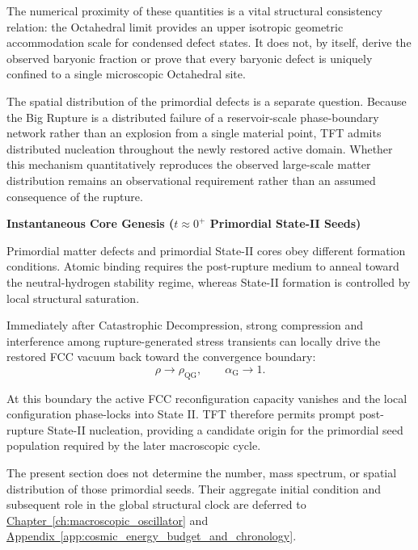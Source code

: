 The numerical proximity of these quantities is a vital structural consistency relation: the Octahedral limit provides an upper isotropic geometric accommodation scale for condensed defect states. It does not, by itself, derive the observed baryonic fraction or prove that every baryonic defect is uniquely confined to a single microscopic Octahedral site.

The spatial distribution of the primordial defects is a separate question. Because the Big Rupture is a distributed failure of a reservoir-scale phase-boundary network rather than an explosion from a single material point, TFT admits distributed nucleation throughout the newly restored active domain. Whether this mechanism quantitatively reproduces the observed large-scale matter distribution remains an observational requirement rather than an assumed consequence of the rupture.


\vspace{0.5em}

\noindent\textbf{Instantaneous Core Genesis (\(t \approx 0^{+}\) Primordial State-II Seeds)}

Primordial matter defects and primordial State-II cores obey different formation conditions. Atomic binding requires the post-rupture medium to anneal toward the neutral-hydrogen stability regime, whereas State-II formation is controlled by local structural saturation.

Immediately after Catastrophic Decompression, strong compression and interference among rupture-generated stress transients can locally drive the restored FCC vacuum back toward the convergence boundary:
\begin{equation}
    \rho
    \rightarrow
    \rho_{\mathrm{QG}},
    \qquad
    \alpha_{\mathrm G}
    \rightarrow
    1.
\end{equation}

At this boundary the active FCC reconfiguration capacity vanishes and the local configuration phase-locks into State II. TFT therefore permits prompt post-rupture State-II nucleation, providing a candidate origin for the primordial seed population required by the later macroscopic cycle.

The present section does not determine the number, mass spectrum, or spatial distribution of those primordial seeds. Their aggregate initial condition and subsequent role in the global structural clock are deferred to \hyperref[ch:macroscopic_oscillator]{Chapter~\ref*{ch:macroscopic_oscillator}} and \hyperref[app:cosmic_energy_budget_and_chronology]{Appendix~\ref*{app:cosmic_energy_budget_and_chronology}}.

